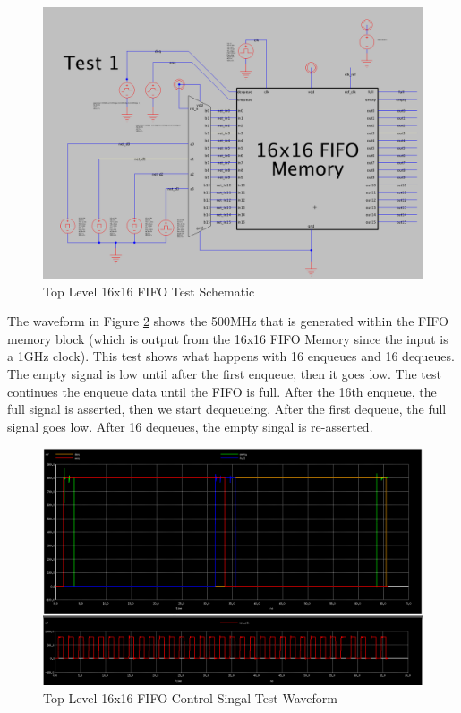 \documentclass[a4paper]{article}
\begin{document}
\begin{figure}[H]
	\centering
	\includegraphics[scale=0.25]{topLevelTestSchematic}
	\caption{Top Level 16x16 FIFO Test Schematic}
	\label{fig:topLevelTestSchematic}
\end{figure}

The waveform in Figure \ref{fig:topLevelTestControlWaveform} shows the 500MHz that is generated within the FIFO memory block (which is output from the 16x16 FIFO Memory since the input is a 1GHz clock). This test shows what happens with 16 enqueues and 16 dequeues. The empty signal is low until after the first enqueue, then it goes low. The test continues the enqueue data until the FIFO is full. After the 16th enqueue, the full signal is asserted, then we start dequeueing. After the first dequeue, the full signal goes low. After 16 dequeues, the empty singal is re-asserted. 

\begin{figure}[H]
	\centering
	\includegraphics[scale=0.25]{topLevelTestControlWaveform}
	\caption{Top Level 16x16 FIFO Control Singal Test Waveform}
	\label{fig:topLevelTestControlWaveform}
\end{figure}
\end{document}

